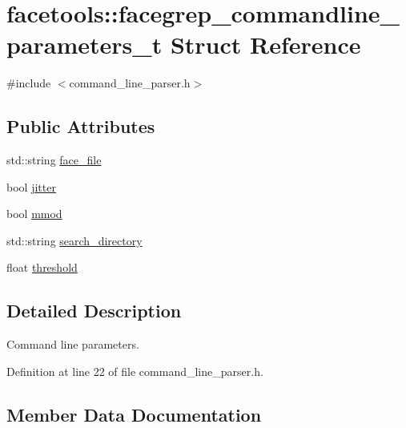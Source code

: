 \hypertarget{structfacetools_1_1facegrep__commandline__parameters__t}{}\section{facetools\+:\+:facegrep\+\_\+commandline\+\_\+parameters\+\_\+t Struct Reference}
\label{structfacetools_1_1facegrep__commandline__parameters__t}


{\ttfamily \#include $<$command\+\_\+line\+\_\+parser.\+h$>$}

\subsection*{Public Attributes}
\begin{DoxyCompactItemize}
\item 
std\+::string \hyperlink{structfacetools_1_1facegrep__commandline__parameters__t_a2537494d9d0d80d128a08a05bd81a145}{face\+\_\+file}
\item 
bool \hyperlink{structfacetools_1_1facegrep__commandline__parameters__t_ada0cdf1d97bd98420c5dcd06901f0f70}{jitter}
\item 
bool \hyperlink{structfacetools_1_1facegrep__commandline__parameters__t_a49b0b6fdc5881378d22b81c48e509b30}{mmod}
\item 
std\+::string \hyperlink{structfacetools_1_1facegrep__commandline__parameters__t_a5b07147c1e2f887aaf5d65a2377c6ef6}{search\+\_\+directory}
\item 
float \hyperlink{structfacetools_1_1facegrep__commandline__parameters__t_accf855e98c9c61398fee6ba8cb97eb05}{threshold}
\end{DoxyCompactItemize}


\subsection{Detailed Description}
Command line parameters. 

Definition at line 22 of file command\+\_\+line\+\_\+parser.\+h.



\subsection{Member Data Documentation}
